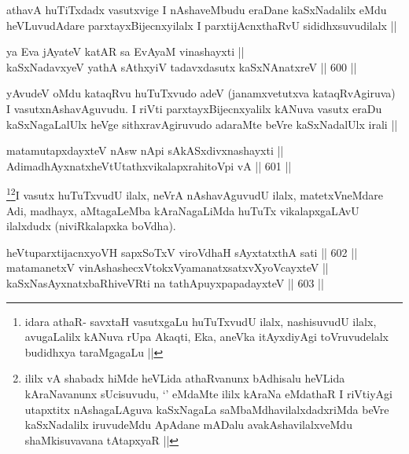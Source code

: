 \begin{artha}
athavA huTiTxdadx vasutxvige I nAshaveMbudu eraDane kaSxNadalilx eMdu heVLuvudAdare parxtayxBijecnxyilalx I parxtijAcnxthaRvU sididhxsuvudilalx ||
\end{artha}


\begin{shl}
ya Eva jAyateV katAR sa EvAyaM vinashayxti || \\
kaSxNadavxyeV yathA sAthxyiV tadavxdasutx kaSxNAnatxreV ||  600 ||  
\end{shl}

\begin{artha}
yAvudeV oMdu kataqRvu huTuTxvudo adeV (janamxvetutxva kataqRvAgiruva) I vasutxnAshavAguvudu. I riVti parxtayxBijecnxyalilx kANuva vasutx eraDu kaSxNagaLalUlx heVge sithxravAgiruvudo adaraMte beVre kaSxNadalUlx irali ||
\end{artha}


\begin{shl}
matamutapxdayxteV nAsw nApi sAkASxdivxnashayxti ||  \\
AdimadhAyxnatxheVtUtathxvikalapxrahitoV\s pi vA ||  601 ||  
\end{shl}

\begin{artha}
\footnote{idara athaR- savxtaH vasutxgaLu huTuTxvudU ilalx, nashisuvudU ilalx, avugaLalilx kANuva rUpa Akaqti, Eka, aneVka itAyxdiyAgi toVruvudelalx budidhxya taraMgagaLu ||}\footnote{ililx vA shabadx hiMde heVLida athaRvanunx bAdhisalu heVLida kAraNavanunx sUcisuvudu, `\stext' eMdaMte ililx kAraNa eMdathaR I riVtiyAgi utapxtitx nAshagaLAguva kaSxNagaLa saMbaMdhavilalxdadxriMda beVre kaSxNadalilx iruvudeMdu ApAdane mADalu avakAshavilalxveMdu shaMkisuvavana tAtapxyaR ||}I vasutx huTuTxvudU ilalx, neVrA nAshavAguvudU ilalx, matetxVneMdare Adi, madhayx, aMtagaLeMba kAraNagaLiMda huTuTx vikalapxgaLAvU ilalxdudx (niviRkalapxka boVdha).
\end{artha}


\begin{shl}
heVtuparxtijacnxyoVH sapxSoTxV viroVdhaH sAyxtatxthA sati ||  602 ||  \\
matamanetxV vinAshashecxVtokxV\s yamanatxsatxvXyoVcayxteV || \\
kaSxNasAyxnatxbaRhiveVRti na tathA\s puyxpapadayxteV ||  603 ||  
\end{shl}

